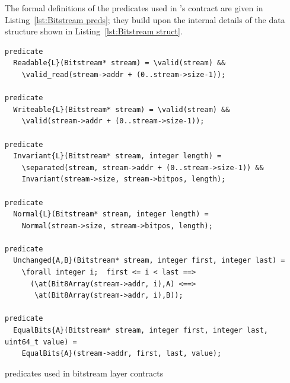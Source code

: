 The formal definitions of the \acsl predicates used
in 's contract are given in
Listing~\ref{lst:Bitstream preds}; they build upon the internal
details of the  data structure shown in
Listing~\ref{lst:Bitstream struct}.



\begin{listing}[hbt]
\begin{minipage}{0.99\textwidth}
\begin{lstlisting}[style=acsl-block]
predicate 
  Readable{L}(Bitstream* stream) = \valid(stream) &&
    \valid_read(stream->addr + (0..stream->size-1));

predicate
  Writeable{L}(Bitstream* stream) = \valid(stream) &&
    \valid(stream->addr + (0..stream->size-1));

predicate
  Invariant{L}(Bitstream* stream, integer length) =
    \separated(stream, stream->addr + (0..stream->size-1)) &&
    Invariant(stream->size, stream->bitpos, length);

predicate
  Normal{L}(Bitstream* stream, integer length) =
    Normal(stream->size, stream->bitpos, length);

predicate
  Unchanged{A,B}(Bitstream* stream, integer first, integer last) =
    \forall integer i;  first <= i < last ==>
      (\at(Bit8Array(stream->addr, i),A) <==>
       \at(Bit8Array(stream->addr, i),B));

predicate
  EqualBits{A}(Bitstream* stream, integer first, integer last, uint64_t value) =
    EqualBits{A}(stream->addr, first, last, value);
\end{lstlisting}
\end{minipage}
\caption{\label{lst:Bitstream preds}
	\acsl predicates used in bitstream layer contracts}
\end{listing}

\FloatBarrier


